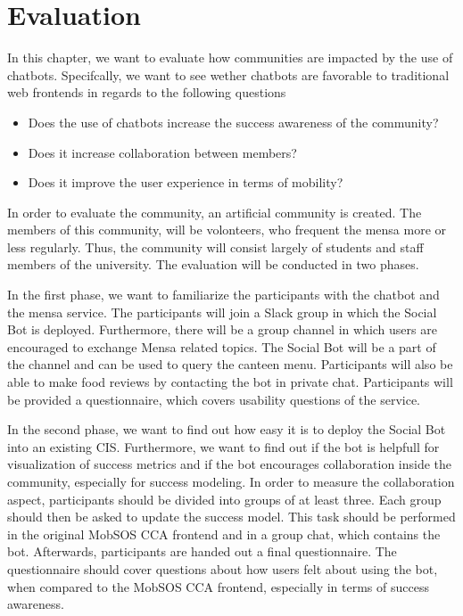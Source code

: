 \chapter{Evaluation}\label{cha:eval}
In this chapter, we want to evaluate how communities are impacted by the use of chatbots. Specifcally, we want to see wether chatbots are favorable to traditional web frontends in regards to the following questions
\begin{itemize}
    \item Does the use of chatbots increase the success awareness of the community?
    \item Does it increase collaboration between members?
    \item Does it improve the user experience in terms of mobility?
\end{itemize}

In order to evaluate the community, an artificial community is created. The members of this community, will be volonteers, who frequent the mensa more or less regularly. Thus, the community will consist largely of students and staff members of the university. The evaluation will be conducted in two phases.

In the first phase, we want to familiarize the participants with the chatbot and the mensa service. The participants will join a Slack group in which the Social Bot is deployed. Furthermore, there will be a group channel in which users are encouraged to exchange Mensa related topics. The Social Bot will be a part of the channel and can be used to query the canteen menu. Participants will also be able to make food reviews by contacting the bot in private chat. Participants will be provided a questionnaire, which covers usability questions of the service.

In the second phase, we want to find out how easy it is to deploy the Social Bot into an existing CIS. Furthermore, we want to find out if the bot is helpfull for visualization of success metrics and if the bot encourages collaboration inside the community, especially for success modeling. In order to measure the collaboration aspect, participants should be divided into groups of at least three. Each group should then be asked to update the success model. This task should be performed in the original MobSOS CCA frontend and in a group chat, which contains the bot.
Afterwards, participants are handed out a final questionnaire. The questionnaire should cover questions about how users felt about using the bot, when compared to the MobSOS CCA frontend, especially in terms of success awareness.


